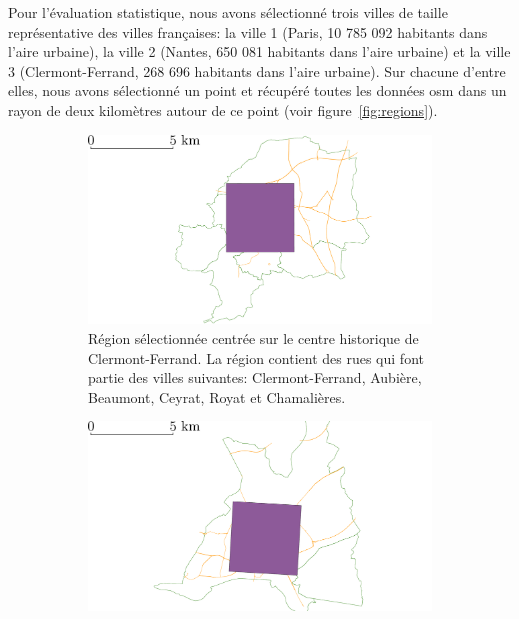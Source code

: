 Pour l'évaluation statistique, nous avons sélectionné trois villes de taille représentative des villes françaises: la ville 1 (Paris, 10 785 092 habitants dans l'aire urbaine), la ville 2 (Nantes, 650 081 habitants dans l'aire urbaine) et la ville 3 (Clermont-Ferrand, 268 696 habitants dans l'aire urbaine). Sur chacune d'entre elles, nous avons sélectionné un point et récupéré toutes les données \gls{osm} dans un rayon de deux kilomètres autour de ce point (voir figure~\ref{fig:regions}).

\newpar{}

\begin{figure}[ht]
    \centering
    \begin{subfigure}[t]{0.49\linewidth}
        \includegraphics[width=\textwidth]{images/evaluation/crseg/clermont.pdf}
        \caption{Région sélectionnée centrée sur le centre historique de Clermont-Ferrand. La région contient des rues qui font partie des villes suivantes: Clermont-Ferrand, Aubière, Beaumont, Ceyrat, Royat et Chamalières.\label{fig:clermontRegion}}
    \end{subfigure}
    \begin{subfigure}[t]{0.49\linewidth}
        \includegraphics[width=\textwidth]{images/evaluation/crseg/nantes.pdf}

\end{subfigure}
\end{figure}
